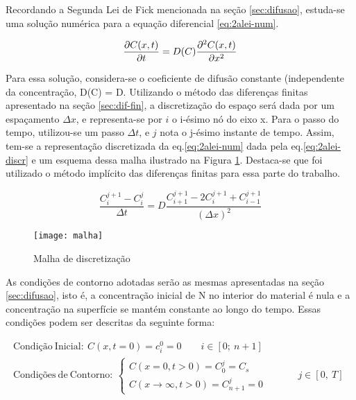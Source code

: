 Recordando a Segunda Lei de Fick mencionada na seção \ref{sec:difusao}, estuda-se uma solução numérica para a equação diferencial \ref{eq:2alei-num}.

\begin{equation}
\label{eq:2alei-num}
\pdv{C(x,t)}{t} = D(C)\pdv[2]{C(x,t)}{x}
\end{equation}

Para essa solução, considera-se o coeficiente de difusão constante (independente da concentração, D(C) = D. Utilizando o método das diferenças finitas apresentado na seção \ref{sec:dif-fin}, a discretização do espaço será dada por um espaçamento {$\Delta x$}, e representa-se por $i$ o i-ésimo nó do eixo x. Para o passo do tempo, utilizou-se um passo {$\Delta t$}, e $j$ nota o j-ésimo instante de tempo. Assim, tem-se a representação discretizada da eq.\ref{eq:2alei-num} dada pela eq.\ref{eq:2alei-discr} e um esquema dessa malha ilustrado na Figura \ref{fig:malha}. Destaca-se que foi utilizado o método implícito das diferenças finitas para essa parte do trabalho.

\begin{equation}
\label{eq:2alei-discr}
\dfrac{C_i^{j+1} - C_i^j}{\Delta t} = D\dfrac{C_{i+1}^{j+1} - 2C_i^{j+1} + C_{i-1}^{j+1}}{(\Delta x)^2}
\end{equation}



\begin{figure}[ht]
	\caption{Malha de discretização}
	\texttt{[image: malha]}
	\label{fig:malha}
	\centering
	\end{figure}


As condições de contorno adotadas serão as mesmas apresentadas na seção \ref{sec:difusao}, isto é, a concentração inicial de N no interior do material é nula e a concentração na superfície se mantém constante ao longo do tempo. Essas condições podem ser descritas da seguinte forma:

\begin{gather*}
		\mathrm{Condição\ Inicial: }\ C(x, t=0) = c_i^0 = 0 \qquad i \in [0;\ n+1] \\
		\mathrm{Condições\ de\ Contorno:}\ 
		\left\{
    		\begin{array}{l}
      			C(x=0, t>0) = C_0^j = C_s  \\
				C(x\rightarrow\infty, t>0) = C_{n+1}^j = 0 
			\end{array}
    		\begin{array}{l}
      		\qquad \\
			\qquad \\	   
    		\end{array}
    		\begin{array}{l}
    			j \in [0,\ T] 
    		\end{array}
		\right.	
\end{gather*}


